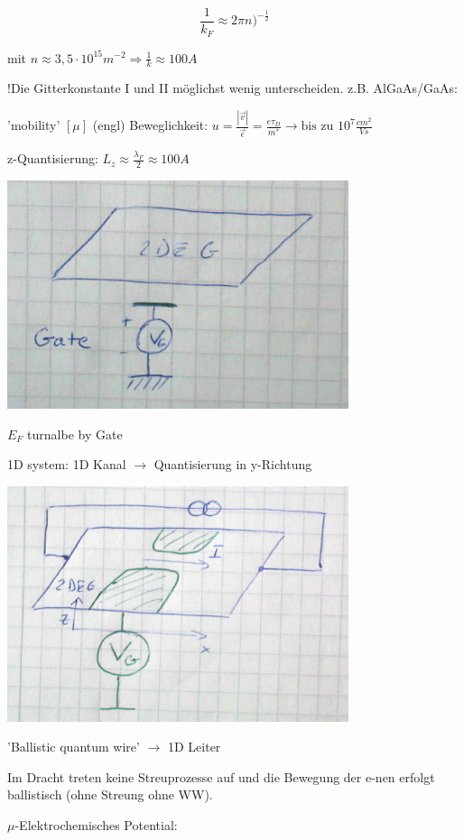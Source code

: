 \[\frac{1}{k_F}\approx 2\pi n)^{-\frac{1}{2}}\]

mit \(n\approx 3,5\cdot 10^{15}m^{-2}\Rightarrow \frac{1}{k}\approx 100 A\)

!Die Gitterkonstante I und II möglichst wenig unterscheiden. z.B. AlGaAs/GaAs: 

'mobility' \([\mu]\) (engl)
Beweglichkeit: \(u=\frac{|\vec v|}{\vec \epsilon} = \frac{e\tau_D}{m^*}\rightarrow \text{bis zu }10^7\frac{cm^2}{Vs}\)

z-Quantisierung: \(L_z\approx\frac{\lambda_F}{2}\approx 100 A\)

\includegraphics[width=0.75\textwidth]{kap11_02.png}

\(E_F\) turnalbe by Gate

1D system: 1D Kanal \(\rightarrow \) Quantisierung in y-Richtung


\includegraphics[width=0.75\textwidth]{kap11_03.png}

'Ballistic quantum wire' \(\rightarrow \) 1D Leiter

Im Dracht treten keine Streuprozesse auf und die Bewegung der e-nen erfolgt ballistisch (ohne Streung ohne WW).

\(\mu\)-Elektrochemisches Potential:

